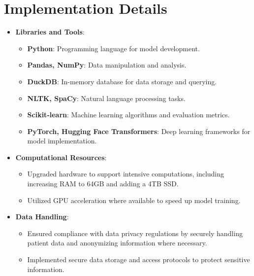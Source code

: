 \documentclass[12pt,a4paper]{report}
\begin{document}
\section{Implementation Details}
\begin{itemize}
    \item \textbf{Libraries and Tools}:
    \begin{itemize}
        \item \textbf{Python}: Programming language for model development.
        \item \textbf{Pandas, NumPy}: Data manipulation and analysis.
        \item \textbf{DuckDB}: In-memory database for data storage and querying.
        \item \textbf{NLTK, SpaCy}: Natural language processing tasks.
        \item \textbf{Scikit-learn}: Machine learning algorithms and evaluation metrics.
        \item \textbf{PyTorch, Hugging Face Transformers}: Deep learning frameworks for model implementation.
    \end{itemize}
    \item \textbf{Computational Resources}:
    \begin{itemize}
        \item Upgraded hardware to support intensive computations, including increasing RAM to 64GB and adding a 4TB SSD.
        \item Utilized GPU acceleration where available to speed up model training.
    \end{itemize}
    \item \textbf{Data Handling}:
    \begin{itemize}
        \item Ensured compliance with data privacy regulations by securely handling patient data and anonymizing information where necessary.
        \item Implemented secure data storage and access protocols to protect sensitive information.
    \end{itemize}
\end{itemize}
\end{document}
